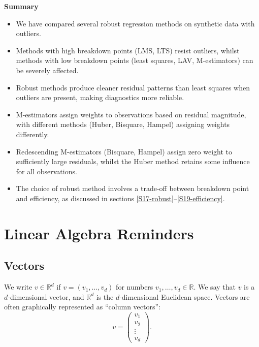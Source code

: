 \documentclass[
  a4paper,
]{article}
\providecommand{\tightlist}{%
  \setlength{\itemsep}{0pt}\setlength{\parskip}{0pt}}
\theoremstyle{definition}
\theoremstyle{definition}
\theoremstyle{definition}
\theoremstyle{definition}
\theoremstyle{remark}
\begin{document}
\textbf{Summary}

\begin{itemize}
\tightlist
\item
  We have compared several robust regression methods on synthetic data
  with outliers.
\item
  Methods with high breakdown points (LMS, LTS) resist outliers,
  whilst methods with low breakdown points (least squares, LAV, M-estimators)
  can be severely affected.
\item
  Robust methods produce cleaner residual patterns than least squares
  when outliers are present, making diagnostics more reliable.
\item
  M-estimators assign weights to observations based on residual magnitude,
  with different methods (Huber, Bisquare, Hampel) assigning weights
  differently.
\item
  Redescending M-estimators (Bisquare, Hampel) assign zero weight to
  sufficiently large residuals, whilst the Huber method retains some
  influence for all observations.
\item
  The choice of robust method involves a trade-off between breakdown point
  and efficiency, as discussed in sections \ref{S17-robust}--\ref{S19-efficiency}.
\end{itemize}

\clearpage

\appendix


\section{Linear Algebra Reminders}\label{Sx1-matrices}

\subsection{Vectors}\label{vectors}

We write \(v \in \mathbb{R}^d\) if \(v = (v_1, \ldots, v_d)\) for numbers
\(v_1, \ldots, v_d \in\mathbb{R}\). We say that \(v\) is a \(d\)-dimensional vector,
and \(\mathbb{R}^d\) is the \(d\)-dimensional Euclidean space. Vectors are
often graphically represented as ``column vectors'':
\begin{equation*}
  v = \begin{pmatrix}
      v_1 \\ v_2 \\ \vdots \\ v_d
  \end{pmatrix}.
\end{equation*}
\end{document}
